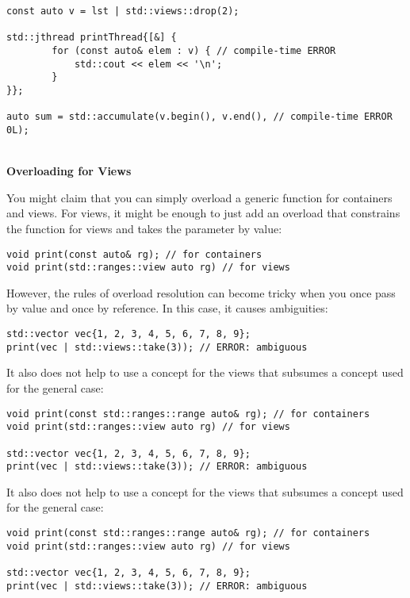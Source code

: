 \begin{lstlisting}[style=styleCXX]
const auto v = lst | std::views::drop(2);

std::jthread printThread{[&] {
		for (const auto& elem : v) { // compile-time ERROR
			std::cout << elem << '\n';
		}
}};

auto sum = std::accumulate(v.begin(), v.end(), // compile-time ERROR
0L);
\end{lstlisting}

\noindent
\hspace*{\fill} \\ %
\textbf{Overloading for Views}

You might claim that you can simply overload a generic function for containers and views. For views, it might be enough to just add an overload that constrains the function for views and takes the parameter by value:

\begin{lstlisting}[style=styleCXX]
void print(const auto& rg); // for containers
void print(std::ranges::view auto rg) // for views
\end{lstlisting}

However, the rules of overload resolution can become tricky when you once pass by value and once by reference. In this case, it causes ambiguities:

\begin{lstlisting}[style=styleCXX]
std::vector vec{1, 2, 3, 4, 5, 6, 7, 8, 9};
print(vec | std::views::take(3)); // ERROR: ambiguous
\end{lstlisting}

It also does not help to use a concept for the views that subsumes a concept used for the general case:

\begin{lstlisting}[style=styleCXX]
void print(const std::ranges::range auto& rg); // for containers
void print(std::ranges::view auto rg) // for views

std::vector vec{1, 2, 3, 4, 5, 6, 7, 8, 9};
print(vec | std::views::take(3)); // ERROR: ambiguous
\end{lstlisting}

It also does not help to use a concept for the views that subsumes a concept used for the general case:

\begin{lstlisting}[style=styleCXX]
void print(const std::ranges::range auto& rg); // for containers
void print(std::ranges::view auto rg) // for views

std::vector vec{1, 2, 3, 4, 5, 6, 7, 8, 9};
print(vec | std::views::take(3)); // ERROR: ambiguous
\end{lstlisting}

